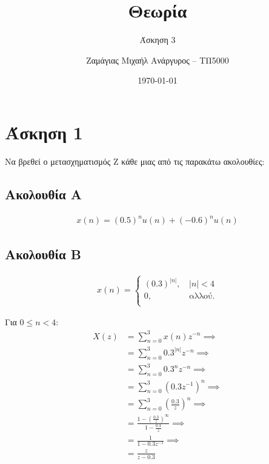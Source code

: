 \documentclass[12pt]{turabian-researchpaper}
\title{Θεωρία}
\subtitle{Άσκηση 3}
\author{Ζαμάγιας Μιχαήλ Ανάργυρος -- ΤΠ5000}
\date{\today}
\begin{document}
\begin{titlepage}
    \maketitle
\end{titlepage}

\tableofcontents

\newpage\section{Άσκηση 1}
Να βρεθεί ο μετασχηματισμός Ζ κάθε μιας από τις παρακάτω ακολουθίες:
\subsection{Ακολουθία A}
\begin{equation*}
    \begin{aligned}
        x(n) = (0.5)^n u(n) + (-0.6)^n u(n)
    \end{aligned}
\end{equation*}

\subsection{Ακολουθία B}
\begin{equation*}
    \begin{aligned}
        x(n) = \begin{cases}
            (0.3)^{| n |} \text{, } & | n | < 4     \\
            0\text{, }              & \text{αλλού.} \\
        \end{cases}
    \end{aligned}
\end{equation*}

Για $ 0 \leq n < 4 $:
\begin{equation*}
    \begin{aligned}
        X(z) & = \sum_{n = 0}^{ 3 } x(n)z^{-n}                                          \implies \\
             & = \sum_{n = 0}^{ 3 } 0.3^{|n|} z^{-n}                                    \implies \\
             & = \sum_{n = 0}^{ 3 } 0.3^{n} z^{-n}                                      \implies \\
             & = \sum_{n = 0}^{ 3 } (0.3 z^{ -1 })^n                                    \implies \\
             & = \sum_{n = 0}^{ 3 } ( \frac{ 0.3 }{ z } )^n                             \implies \\
             & = \frac{ 1 - ( \frac{ 0.3 }{ z } )^{ \infty } }{ 1 - \frac{ 0.3 }{ z } } \implies \\
             & = \frac{ 1 }{ 1 - 0.3 z^{ -1 } }                                         \implies \\
             & = \frac{ z }{ z - 0.3 }
    \end{aligned}
\end{equation*}
\end{document}
